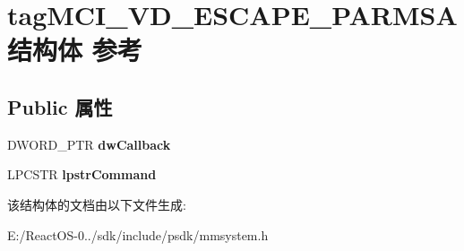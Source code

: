 \hypertarget{structtag_m_c_i___v_d___e_s_c_a_p_e___p_a_r_m_s_a}{}\section{tag\+M\+C\+I\+\_\+\+V\+D\+\_\+\+E\+S\+C\+A\+P\+E\+\_\+\+P\+A\+R\+M\+S\+A结构体 参考}
\label{structtag_m_c_i___v_d___e_s_c_a_p_e___p_a_r_m_s_a}
\subsection*{Public 属性}
\begin{DoxyCompactItemize}
\item 
\mbox{\label{structtag_m_c_i___v_d___e_s_c_a_p_e___p_a_r_m_s_a_a512e742ef7dce6367b220eb48d58b435}} 
D\+W\+O\+R\+D\+\_\+\+P\+TR {\bfseries dw\+Callback}
\item 
\mbox{\label{structtag_m_c_i___v_d___e_s_c_a_p_e___p_a_r_m_s_a_a0fd45751b7c7fd3815daebf74260038d}} 
L\+P\+C\+S\+TR {\bfseries lpstr\+Command}
\end{DoxyCompactItemize}


该结构体的文档由以下文件生成\+:\begin{DoxyCompactItemize}
\item 
E\+:/\+React\+O\+S-\/0../sdk/include/psdk/mmsystem.\+h\end{DoxyCompactItemize}
